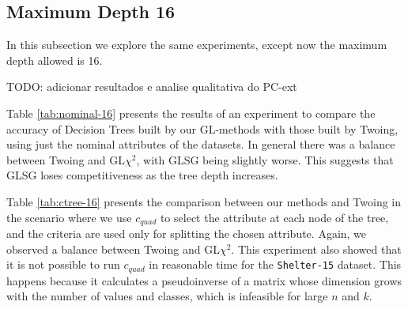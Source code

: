 \subsection{Maximum Depth 16}


In this subsection we explore the same experiments, except now the maximum depth allowed is 16. 

TODO: adicionar resultados e analise qualitativa do PC-ext

Table \ref{tab:nominal-16} presents  the results of an experiment to
compare the accuracy of  Decision Trees built by our GL-methods with those built by Twoing, using just the nominal attributes of the datasets.
In general there was a balance between Twoing and GL$\chi^2$, with GLSG being slightly worse. This suggests that GLSG loses competitiveness as the tree depth increases.

Table \ref{tab:ctree-16} presents the 
comparison between  our  methods and Twoing in the scenario where we use $c_{quad}$ to select the attribute at each node of the tree, and the criteria are used only for splitting the chosen attribute. Again, we observed a balance between Twoing and GL$\chi^2$. This experiment also showed that it is not possible to run $c_{quad}$ in reasonable time for the {\tt Shelter-15} dataset. This happens because it calculates a pseudoinverse of a matrix whose dimension grows with the number of values and classes, which is infeasible for large $n$ and $k$.


